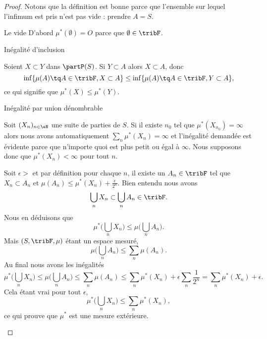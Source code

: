 \begin{proof}
    Notons que la définition est bonne parce que l'ensemble sur lequel l'infimum est pris n'est pas vide : prendre \( A=S\).
    \begin{subproof}
    \item[Le vide]
        D'abord \( \mu^*(\emptyset)=O\) parce que \( \emptyset\in\tribF\).
    \item[Inégalité d'inclusion]

        Soient \( X\subset Y\) dans \( \partP(S)\). Si \( Y\subset A\) alors \( X\subset A\), donc
        \begin{equation}
            \inf \{ \mu(A)\tq A\in\tribF,X\subset A \}\leq \inf \{ \mu(A)\tq A\in\tribF,Y\subset A \},
        \end{equation}
        ce qui signifie que \( \mu^*(X)\leq \mu^*(Y)\).
    \item[Inégalité par union dénombrable]

        Soit \( (X_n)_{n\in \eN}\) une suite de parties de \( S\). Si il existe \( n_0\) tel que \( \mu^*(X_{n_0})=\infty\) alors nous avons automatiquement \( \sum_n\mu^*(X_n)=\infty\) et l'inégalité demandée est évidente parce que n'importe quoi est plus petit ou égal à \( \infty\). Nous supposons donc que \( \mu^*(X_n)<\infty\) pour tout \( n\).

        Soit \( \epsilon>\) et par définition pour chaque \( n\), il existe un \( A_n\in \tribF\) tel que \( X_n\subset A_n\) et \( \mu(A_n)\leq \mu^*(X_n)+\frac{ \epsilon }{ 2^n }\). Bien entendu nous avons
        \begin{equation}
            \bigcup_nX_n\subset \bigcup_nA_n\in\tribF.
        \end{equation}
        Nous en déduisons que
        \begin{equation}
            \mu^*\big( \bigcup_nX_n \big)\leq\mu\big( \bigcup_nA_n \big).
        \end{equation}
        Mais \( (S,\tribF,\mu)\) étant un espace mesuré,
        \begin{equation}
            \mu\big( \bigcup_nA_n \big)\leq \sum_n\mu(A_n).
        \end{equation}
        Au final nous avons les inégalités
        \begin{equation}
            \mu^*\big( \bigcup_nX_n \big)\leq \mu\big( \bigcup_nA_n \big)\leq\sum_n\mu(A_n)\leq \sum_n\mu^*(X_n)+\epsilon\sum_n\frac{1}{ 2^n }=\sum_n\mu^*(X_n)+\epsilon.
        \end{equation}
        Cela étant vrai pour tout \( \epsilon\),
        \begin{equation}
            \mu^*\big( \bigcup_nX_n \big)\leq\sum_n\mu^*(X_n),
        \end{equation}
        ce qui prouve que \( \mu^*\) est une mesure extérieure.


\end{subproof}
\end{proof}
